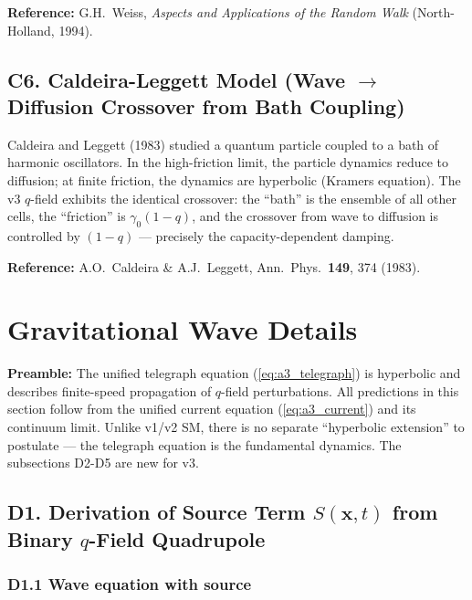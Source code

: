 \documentclass[reprint]{revtex4-2}
\begin{document}
\textbf{Reference:} G.H.\ Weiss, \emph{Aspects and Applications of the Random Walk} (North-Holland, 1994).

\subsection{C6. Caldeira-Leggett Model (Wave $\to$ Diffusion Crossover from Bath Coupling)}

Caldeira and Leggett (1983) studied a quantum particle coupled to a bath of harmonic oscillators. In the high-friction limit, the particle dynamics reduce to diffusion; at finite friction, the dynamics are hyperbolic (Kramers equation). The v3 $q$-field exhibits the identical crossover: the ``bath'' is the ensemble of all other cells, the ``friction'' is $\gamma_0(1-q)$, and the crossover from wave to diffusion is controlled by $(1-q)$ --- precisely the capacity-dependent damping.

\textbf{Reference:} A.O.\ Caldeira \& A.J.\ Leggett, Ann.\ Phys.\ \textbf{149}, 374 (1983).

\section{Gravitational Wave Details}

\textbf{Preamble:} The unified telegraph equation (\ref{eq:a3_telegraph}) is hyperbolic and describes finite-speed propagation of $q$-field perturbations. All predictions in this section follow from the unified current equation (\ref{eq:a3_current}) and its continuum limit. Unlike v1/v2 SM, there is no separate ``hyperbolic extension'' to postulate --- the telegraph equation is the fundamental dynamics. The subsections D2-D5 are new for v3.

\subsection{D1. Derivation of Source Term $S(\mathbf{x},t)$ from Binary $q$-Field Quadrupole}

\subsubsection{D1.1 Wave equation with source}
\end{document}
